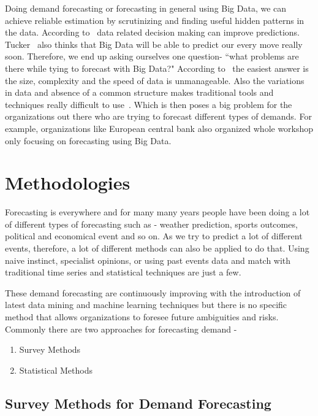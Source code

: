 Doing demand forecasting or forecasting in general using Big Data, we can achieve reliable estimation by scrutinizing and finding useful hidden patterns in the data. According to~\cite{richards2013three} data related decision making can improve predictions. Tucker~\cite{tucker} also thinks that Big Data will be able to predict our every move really soon. Therefore, we end up asking ourselves one question- ``what problems are there while tying to forecast with Big Data?" According to~\cite{madden2012databases} the easiest answer is the size, complexity and the speed of data is unmanageable. Also the variations in data and absence of a common structure makes traditional tools and techniques really difficult to use~\cite{arribas2014accidental}. Which is then poses a big problem for the organizations out there who are trying to forecast different types of demands. For example, organizations like European central bank also organized whole workshop only focusing on forecasting using Big Data. 


\section {Methodologies}
\label{methods}

Forecasting is everywhere and for many many years people have been doing a lot of different types of forecasting such as - weather prediction, sports outcomes, political and economical event and so on. As we try to predict a lot of different events, therefore, a lot of different methods can also be applied to do that. Using naive instinct, specialist opinions, or using past events data and match with traditional time series and statistical techniques are just a few.

These demand forecasting are continuously improving with the introduction of latest data mining and machine learning techniques but there is no specific method that allows organizations to foresee future ambiguities and risks. Commonly there are two approaches for forecasting demand - 

\begin{enumerate}
\item Survey Methods
\item Statistical Methods
\end {enumerate}


\subsection {Survey Methods for Demand Forecasting }
\label{survey}

